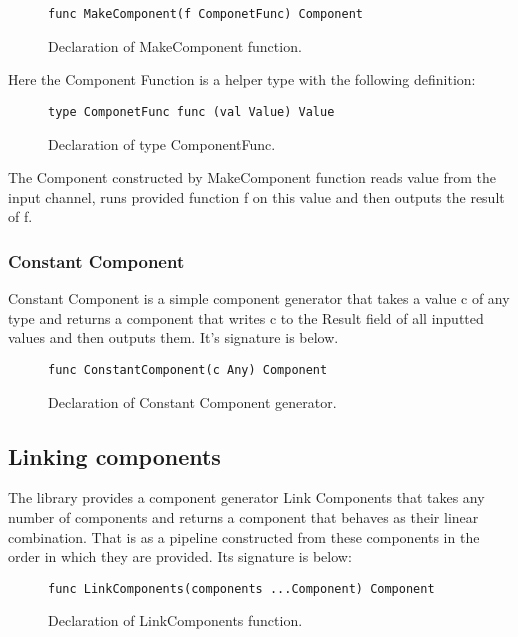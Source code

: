 \documentclass[12pt,a4paper]{article}
\begin{document}
\begin{figure}[h]
\centering
\begin{lstlisting}
func MakeComponent(f ComponetFunc) Component
\end{lstlisting}
\caption[scale=1.0]{Declaration of MakeComponent function.}
\label{fig:MakeComponent}
\end{figure}

Here the Component Function is a helper type with the following definition:

\begin{figure}[h]
\centering
\begin{lstlisting}
type ComponetFunc func (val Value) Value
\end{lstlisting}
\caption[scale=1.0]{Declaration of type ComponentFunc.}
\label{fig:ComponentFunc}
\end{figure}

The Component constructed by MakeComponent function reads value from the
input channel, runs provided function f on this value and then outputs the
result of f.

\subsubsection{Constant Component}
Constant Component is a simple component generator that takes a value c
of any type and returns a component that writes c to the Result field of 
all inputted values and then outputs them. It's signature is below.

\begin{figure}[h]
\centering
\begin{lstlisting}
func ConstantComponent(c Any) Component
\end{lstlisting}
\caption[scale=1.0]{Declaration of Constant Component generator.}
\label{fig:ConstantComponent}
\end{figure}


\subsection{Linking components}
The library provides a component generator Link Components that takes 
any number of components and returns a component that behaves as their 
linear combination. That is as a pipeline constructed from these components 
in the order in which they are provided. Its signature is below:

\begin{figure}[h]
\centering
\begin{lstlisting}
func LinkComponents(components ...Component) Component
\end{lstlisting}
\caption[scale=1.0]{Declaration of LinkComponents function.}
\label{fig:LinkComponents}
\end{figure}
\end{document}
